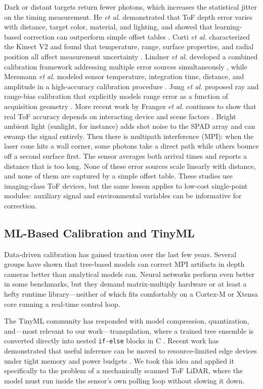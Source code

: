 \documentclass[conference, a4paper]{IEEEtran}
\begin{document}
Dark or distant targets return fewer photons, which increases the statistical jitter on the timing measurement. He \emph{et al.} demonstrated that ToF depth error varies with distance, target color, material, and lighting, and showed that learning-based correction can outperform simple offset tables \cite{he2017depth}. Corti \emph{et al.} characterized the Kinect V2 and found that temperature, range, surface properties, and radial position all affect measurement uncertainty \cite{corti2016metrological}. Lindner \emph{et al.} developed a combined calibration framework addressing multiple error sources simultaneously \cite{lindner2010time}, while Mersmann \emph{et al.} modeled sensor temperature, integration time, distance, and amplitude in a high-accuracy calibration procedure \cite{mersmann2013calibration}. Jung \emph{et al.} proposed ray and range-bias calibration that explicitly models range error as a function of acquisition geometry \cite{jung2015tof}. More recent work by Frangez \emph{et al.} continues to show that real ToF accuracy depends on interacting device and scene factors \cite{frangez2022assessment}. Bright ambient light (sunlight, for instance) adds shot noise to the SPAD array and can swamp the signal entirely. Then there is multipath interference (MPI): when the laser cone hits a wall corner, some photons take a direct path while others bounce off a second surface first. The sensor averages both arrival times and reports a distance that is too long. None of these error sources scale linearly with distance, and none of them are captured by a simple offset table. These studies use imaging-class ToF devices, but the same lesson applies to low-cost single-point modules: auxiliary signal and environmental variables can be informative for correction.

\subsection{ML-Based Calibration and TinyML}
Data-driven calibration has gained traction over the last few years. Several groups have shown that tree-based models can correct MPI artifacts in depth cameras better than analytical models can. Neural networks perform even better in some benchmarks, but they demand matrix-multiply hardware or at least a hefty runtime library---neither of which fits comfortably on a Cortex-M or Xtensa core running a real-time control loop.

The TinyML community has responded with model compression, quantization, and---most relevant to our work---transpilation, where a trained tree ensemble is converted directly into nested \texttt{if-else} blocks in C \cite{wang2020tinyml}. Recent work has demonstrated that useful inference can be moved to resource-limited edge devices under tight memory and power budgets \cite{hayajneh2024tinyml}. We took this idea and applied it specifically to the problem of a mechanically scanned ToF LiDAR, where the model must run inside the sensor's own polling loop without slowing it down.
\end{document}

